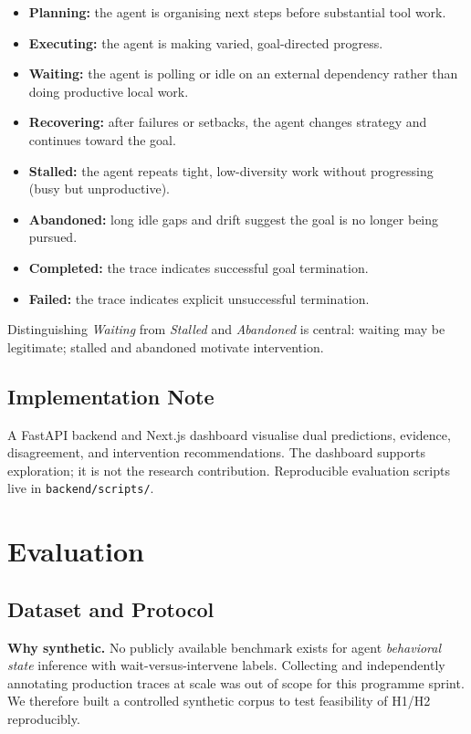 \documentclass[conference]{IEEEtran}
\begin{document}
\begin{itemize}
\item \textbf{Planning:} the agent is organising next steps before substantial tool work.
\item \textbf{Executing:} the agent is making varied, goal-directed progress.
\item \textbf{Waiting:} the agent is polling or idle on an external dependency rather than
      doing productive local work.
\item \textbf{Recovering:} after failures or setbacks, the agent changes strategy and
      continues toward the goal.
\item \textbf{Stalled:} the agent repeats tight, low-diversity work without progressing
      (busy but unproductive).
\item \textbf{Abandoned:} long idle gaps and drift suggest the goal is no longer being
      pursued.
\item \textbf{Completed:} the trace indicates successful goal termination.
\item \textbf{Failed:} the trace indicates explicit unsuccessful termination.
\end{itemize}

\noindent Distinguishing \emph{Waiting} from \emph{Stalled} and \emph{Abandoned} is
central: waiting may be legitimate; stalled and abandoned motivate intervention.

\subsection{Implementation Note}

A FastAPI backend and Next.js dashboard visualise dual predictions, evidence,
disagreement, and intervention recommendations. The dashboard supports exploration; it is
not the research contribution. Reproducible evaluation scripts live in
\texttt{backend/scripts/}.

\section{Evaluation}

\subsection{Dataset and Protocol}

\textbf{Why synthetic.} No publicly available benchmark exists for agent
\emph{behavioral state} inference with wait-versus-intervene labels. Collecting and
independently annotating production traces at scale was out of scope for this programme
sprint. We therefore built a controlled synthetic corpus to test feasibility of H1/H2
reproducibly.
\end{document}

